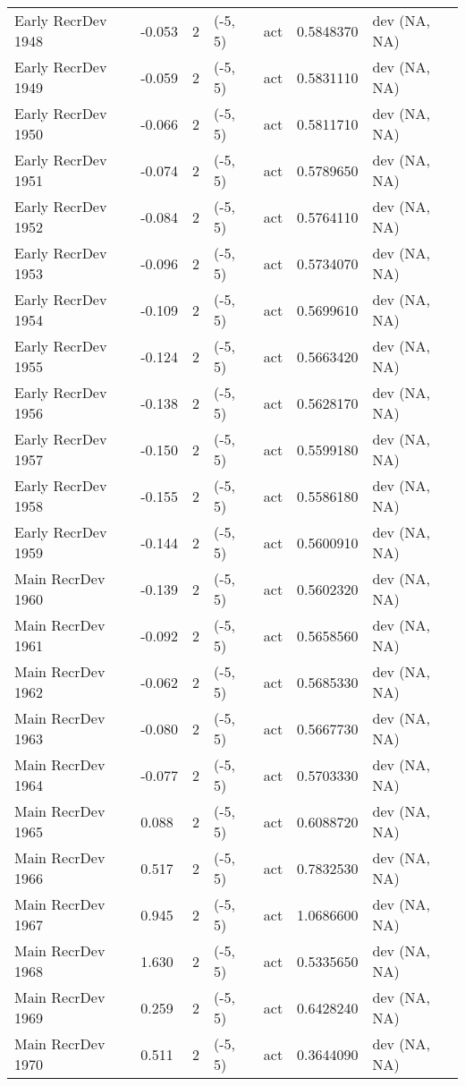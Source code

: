 \documentclass[11pt,
  english,
  letterpaper,
]{article}
\begin{document}
\begin{landscape}
\begin{longtable}[t]{>{\raggedright\arraybackslash}p{7cm}lllll>{\raggedright\arraybackslash}p{4cm}}
Early RecrDev 1948 & -0.053 & 2 & (-5, 5) & act & 0.5848370 & dev (NA, NA)\\
Early RecrDev 1949 & -0.059 & 2 & (-5, 5) & act & 0.5831110 & dev (NA, NA)\\
Early RecrDev 1950 & -0.066 & 2 & (-5, 5) & act & 0.5811710 & dev (NA, NA)\\
Early RecrDev 1951 & -0.074 & 2 & (-5, 5) & act & 0.5789650 & dev (NA, NA)\\
Early RecrDev 1952 & -0.084 & 2 & (-5, 5) & act & 0.5764110 & dev (NA, NA)\\
Early RecrDev 1953 & -0.096 & 2 & (-5, 5) & act & 0.5734070 & dev (NA, NA)\\
Early RecrDev 1954 & -0.109 & 2 & (-5, 5) & act & 0.5699610 & dev (NA, NA)\\
Early RecrDev 1955 & -0.124 & 2 & (-5, 5) & act & 0.5663420 & dev (NA, NA)\\
Early RecrDev 1956 & -0.138 & 2 & (-5, 5) & act & 0.5628170 & dev (NA, NA)\\
Early RecrDev 1957 & -0.150 & 2 & (-5, 5) & act & 0.5599180 & dev (NA, NA)\\
Early RecrDev 1958 & -0.155 & 2 & (-5, 5) & act & 0.5586180 & dev (NA, NA)\\
Early RecrDev 1959 & -0.144 & 2 & (-5, 5) & act & 0.5600910 & dev (NA, NA)\\
Main RecrDev 1960 & -0.139 & 2 & (-5, 5) & act & 0.5602320 & dev (NA, NA)\\
Main RecrDev 1961 & -0.092 & 2 & (-5, 5) & act & 0.5658560 & dev (NA, NA)\\
Main RecrDev 1962 & -0.062 & 2 & (-5, 5) & act & 0.5685330 & dev (NA, NA)\\
Main RecrDev 1963 & -0.080 & 2 & (-5, 5) & act & 0.5667730 & dev (NA, NA)\\
Main RecrDev 1964 & -0.077 & 2 & (-5, 5) & act & 0.5703330 & dev (NA, NA)\\
Main RecrDev 1965 & 0.088 & 2 & (-5, 5) & act & 0.6088720 & dev (NA, NA)\\
Main RecrDev 1966 & 0.517 & 2 & (-5, 5) & act & 0.7832530 & dev (NA, NA)\\
Main RecrDev 1967 & 0.945 & 2 & (-5, 5) & act & 1.0686600 & dev (NA, NA)\\
Main RecrDev 1968 & 1.630 & 2 & (-5, 5) & act & 0.5335650 & dev (NA, NA)\\
Main RecrDev 1969 & 0.259 & 2 & (-5, 5) & act & 0.6428240 & dev (NA, NA)\\
Main RecrDev 1970 & 0.511 & 2 & (-5, 5) & act & 0.3644090 & dev (NA, NA)\\

\end{longtable}
\end{landscape}
\end{document}
